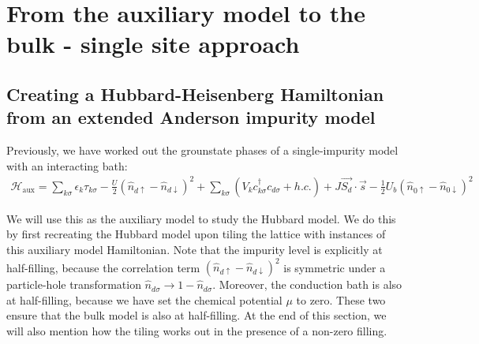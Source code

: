 \documentclass{report}
\numberwithin{equation}{section}
\begin{document}
\chapter{From the auxiliary model to the bulk - single site approach}
\label{chap:tile}

\section{Creating a Hubbard-Heisenberg Hamiltonian from an extended Anderson impurity model}

Previously, we have worked out the grounstate phases of a single-impurity model with an interacting bath:
\begin{equation}\begin{aligned}
	\label{siam_attr}
	\mathcal{H}_\text{aux} = \sum_{k\sigma}\epsilon_k \tau_{k\sigma} - \frac{U}{2}\left(\hat n_{d \uparrow} - \hat n_{d \downarrow} \right) ^2 + \sum_{k\sigma} \left(V_{k} c^\dagger_{k\sigma} c_{d\sigma} + h.c.\right) +J \vec{S_d}\cdot\vec{s} - \frac{1}{2}U_b\left(\hat n_{0 \uparrow} - \hat n_{0 \downarrow}\right)^2 
\end{aligned}\end{equation}
 
We will use this as the auxiliary model to study the Hubbard model. We do this by first recreating the Hubbard model upon tiling the lattice with instances of this auxiliary model Hamiltonian. Note that the impurity level is explicitly at half-filling, because the correlation term \(\left( \hat n_{d \uparrow} - \hat n_{d \downarrow} \right) ^2\) is symmetric under a particle-hole transformation \(\hat n_{d\sigma} \to 1 - \hat n_{d\sigma}\). Moreover, the conduction bath is also at half-filling, because we have set the chemical potential \(\mu\) to zero. These two ensure that the bulk model is also at half-filling. At the end of this section, we will also mention how the tiling works out in the presence of a non-zero filling.
\end{document}
